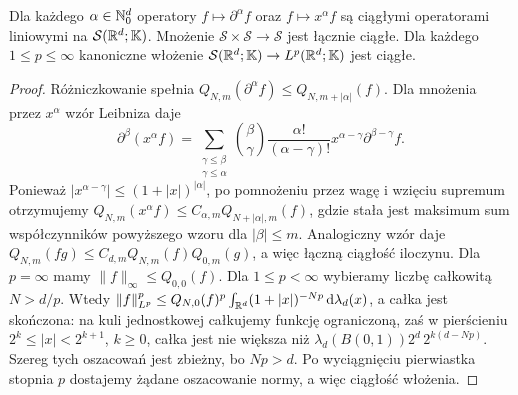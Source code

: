 \begin{stwierdzenie}
\label{prop:schwartz-operators17}
Dla każdego $\alpha\in\mathbb N_0^d$ operatory
$f\mapsto\partial^\alpha f$ oraz $f\mapsto x^\alpha f$
są ciągłymi operatorami liniowymi na $\mathcal S(\mathbb R^d;\mathbb K)$.
Mnożenie $\mathcal S\times\mathcal S\to\mathcal S$ jest
łącznie ciągłe. Dla każdego $1\le p\le\infty$
kanoniczne włożenie $\mathcal S(\mathbb R^d;\mathbb K)\to L^p(\mathbb R^d;\mathbb K)$
jest ciągłe.
\end{stwierdzenie}
\begin{proof}
Różniczkowanie spełnia
$Q_{N,m}(\partial^\alpha f)\le Q_{N,m+|\alpha|}(f)$.
Dla mnożenia przez $x^\alpha$ wzór Leibniza daje
\[
\partial^\beta(x^\alpha f)=
\sum_{\substack{\gamma\le\beta\\\gamma\le\alpha}}
\binom{\beta}{\gamma}\frac{\alpha!}{(\alpha-\gamma)!}
x^{\alpha-\gamma}\partial^{\beta-\gamma}f.
\]
Ponieważ $|x^{\alpha-\gamma}|\le(1+|x|)^{|\alpha|}$,
po pomnożeniu przez wagę i wzięciu supremum otrzymujemy
$Q_{N,m}(x^\alpha f)\le C_{\alpha,m}Q_{N+|\alpha|,m}(f)$,
gdzie stała jest maksimum sum współczynników powyższego wzoru
dla $|\beta|\le m$. Analogiczny wzór daje
$Q_{N,m}(fg)\le C_{d,m}Q_{N,m}(f)Q_{0,m}(g)$,
a więc łączną ciągłość iloczynu.
Dla $p=\infty$ mamy $\|f\|_\infty\le Q_{0,0}(f)$.
Dla $1\le p<\infty$ wybieramy liczbę całkowitą $N>d/p$.
Wtedy
$\|f\|_{L^p}^p\le Q_{N,0}(f)^p
\int_{\mathbb R^d}(1+|x|)^{-Np}\,\mathrm d\lambda_d(x)$,
a całka jest skończona: na kuli jednostkowej całkujemy
funkcję ograniczoną, zaś w pierścieniu
$2^k\le|x|<2^{k+1}$, $k\ge0$, całka jest nie większa niż
$\lambda_d(B(0,1))2^d\,2^{k(d-Np)}$.
Szereg tych oszacowań jest zbieżny, bo $Np>d$.
Po wyciągnięciu pierwiastka stopnia $p$ dostajemy
żądane oszacowanie normy, a więc ciągłość włożenia.
\end{proof}

